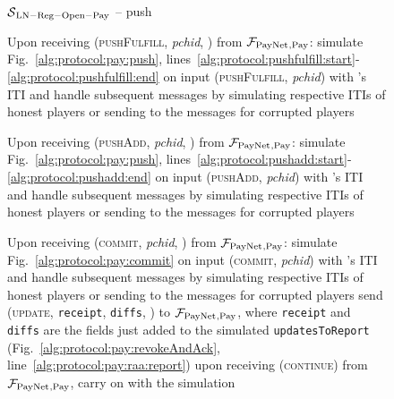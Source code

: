 \begin{figure}[!htbp]
  \begin{simulatorbox}{$\mathcal{S}{}_{\mathrm{LN - Reg - Open - Pay}}$ -- push}
    \begin{algorithmic}[1]
      \State Upon receiving (\textsc{pushFulfill}, \textit{pchid}, \alice) from
      $\mathcal{F}_{\mathrm{PayNet}}{}_{\mathrm{, Pay}}$:
      \Indent
        \State simulate Fig.~\ref{alg:protocol:pay:push},
        lines~\ref{alg:protocol:pushfulfill:start}-\ref{alg:protocol:pushfulfill:end}
        on input (\textsc{pushFulfill}, \textit{pchid}) with \alice's ITI and
        handle subsequent messages by simulating respective ITIs of honest
        players or sending to \adversary{} the messages for corrupted players
        \label{alg:sim:push:fulfill}
      \EndIndent
      \Statex

      \State Upon receiving (\textsc{pushAdd}, \textit{pchid}, \alice) from
      $\mathcal{F}_{\mathrm{PayNet}}{}_{\mathrm{, Pay}}$:
      \Indent
        \State simulate Fig.~\ref{alg:protocol:pay:push},
        lines~\ref{alg:protocol:pushadd:start}-\ref{alg:protocol:pushadd:end} on
        input (\textsc{pushAdd}, \textit{pchid}) with \alice's ITI and handle
        subsequent messages by simulating respective ITIs of honest players or
        sending to \adversary{} the messages for corrupted players
        \label{alg:sim:push:add}
      \EndIndent
      \Statex

      \State Upon receiving (\textsc{commit}, \textit{pchid}, \alice) from
      $\mathcal{F}_{\mathrm{PayNet}}{}_{\mathrm{, Pay}}$:
      \Indent
        \State simulate Fig.~\ref{alg:protocol:pay:commit} on input
        (\textsc{commit}, \textit{pchid}) with \alice's ITI and handle
        subsequent messages by simulating respective ITIs of honest players or
        sending to \adversary{} the messages for corrupted players
        \label{alg:sim:push:commit}
          \State send (\textsc{update}, \texttt{receipt}, \texttt{diffs},
          \alice) to $\mathcal{F}_{\mathrm{PayNet}}{}_{\mathrm{, Pay}}$, where \texttt{receipt} and
          \texttt{diffs} are the fields just added to the simulated
          \texttt{updatesToReport}
          (Fig.~\ref{alg:protocol:pay:revokeAndAck},
          line~\ref{alg:protocol:pay:raa:report})
          \label{alg:sim:push:report}
          \State upon receiving (\textsc{continue}) from $\mathcal{F}_{\mathrm{PayNet}}{}_{\mathrm{,
          Pay}}$, carry on with the simulation
        \EndIf
      \EndIndent
    \end{algorithmic}
  \end{simulatorbox}
  \caption{}
  \label{alg:sim:push}
\end{figure}

